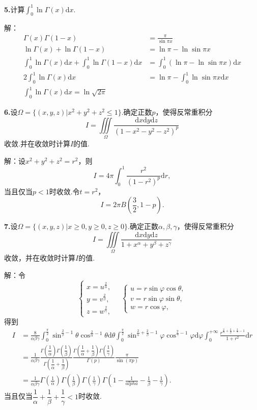 \documentclass[12pt, a4paper]{article}
\newcommand{\dif}{\mathrm{d}}
\begin{document}
\textbf{5.}计算\(\int_0^1 \ln\Gamma(x)\dif x\).

解：
\begin{align*}
\Gamma(x)\Gamma(1 - x) &= \frac{\pi}{\sin\pi x} \\
\ln\Gamma(x) + \ln\Gamma(1 - x) &= \ln\pi - \ln\sin\pi x \\
\int_0^1 \ln\Gamma(x)\dif x + \int_0^1 \ln\Gamma(1 - x)\dif x &= \int_0^1 (\ln\pi - \ln\sin\pi x)\dif x \\
2\int_0^1 \ln\Gamma(x)\dif x &= \ln\pi - \int_0^1 \ln\sin\pi x\dif x \\
\int_0^1 \ln\Gamma(x)\dif x = \ln\sqrt{2\pi}
\end{align*}

\textbf{6.}设\(\Omega = \{(x, y, z)|x^2 + y^2 + z^2 \leq 1\}\).确定正数\(p\)，使得反常重积分
\[I = \iiint\limits_\Omega \frac{\dif x\dif y\dif z}{(1 - x^2 - y^2 - z^2)^p}\]
收敛.并在收敛时计算\(I\)的值.

解：设\(x^2 + y^2 + z^2 = r^2\)，则
\[I = 4\pi\int_0^1 \frac{r^2}{(1 - r^2)^p}\dif r,\]
当且仅当\(p < 1\)时收敛.令\(t = r^2\)，
\[I = 2\pi B\left(\frac{3}{2}, 1 - p\right).\]

\textbf{7.}设\(\Omega = \{(x, y, z)|x \geq 0, y \geq 0, z \geq 0\}\).确定正数\(\alpha, \beta, \gamma\)，使得反常重积分
\[I = \iiint\limits_\Omega \frac{\dif x\dif y\dif z}{1 + x^\alpha + y^\beta + z^\gamma}\]
收敛，并在收敛时计算\(I\)的值.

解：令
\[\begin{cases}
x = u^{\frac{2}{\alpha}}, \\
y = v^{\frac{2}{\beta}}, \\
z = w^{\frac{2}{\gamma}},
\end{cases} \quad \begin{cases}
u = r\sin\varphi\cos\theta, \\
v = r\sin\varphi\sin\theta, \\
w = r\cos\varphi,
\end{cases}\]
得到
\begin{align*}
I &= \frac{8}{\alpha\beta\gamma}\int_{0}^{\frac{\pi}{2}} \sin^{\frac{2}{\beta} - 1}\theta\cos^{\frac{2}{\alpha} - 1}\theta\dif\theta \int_{0}^{\frac{\pi}{2}} \sin^{\frac{2}{\alpha} + \frac{2}{\beta} - 1}\varphi\cos^{\frac{2}{\gamma} - 1}\varphi\dif\varphi \int_{0}^{+\infty} \frac{r^{\frac{2}{\alpha} + \frac{2}{\beta} + \frac{2}{\gamma} - 1}}{1 + r^2}\dif r \\
&= \frac{1}{\alpha\beta\gamma}\frac{\Gamma\left(\dfrac{1}{\alpha}\right)\Gamma\left(\dfrac{1}{\beta}\right)}{\Gamma\left(\dfrac{1}{\alpha} + \dfrac{1}{\beta}\right)}\frac{\Gamma\left(\dfrac{1}{\alpha} + \dfrac{1}{\beta}\right)\Gamma\left(\dfrac{1}{\gamma}\right)}{\Gamma(p)}\frac{\pi}{\sin(\pi p)} \\
&= \frac{1}{\alpha\beta\gamma}\Gamma\left(\frac{1}{\alpha}\right)\Gamma\left(\frac{1}{\beta}\right)\Gamma\left(\frac{1}{\gamma}\right)\Gamma\left(1 - \frac{1}{alpha} - \frac{1}{\beta} - \frac{1}{\gamma}\right).
\end{align*}
当且仅当\(\dfrac{1}{\alpha} + \dfrac{1}{\beta} + \dfrac{1}{\gamma} < 1\)时收敛.
\end{document}
